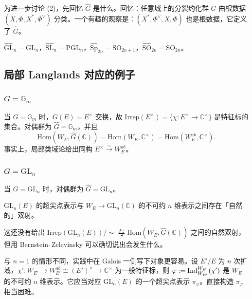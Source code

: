 为进一步讨论 (2)，先回忆 $\widehat{G}$ 是什么。回忆：任意域上的分裂约化群 $G$ 由根数据 $(X,\Phi,X^*,\Phi^\vee)$ 分类。一个有趣的观察是：$(X^*,\Phi^\vee,X,\Phi)$ 也是根数据，它定义了 $\widehat{G}$。

\begin{example}[一些对偶群]
$\widehat{\mathrm{GL}}_n=\mathrm{GL}_n$，$\widehat{\mathrm{SL}}_n=\mathrm{PGL}_n$，$\widehat{\mathrm{Sp}}_{2n}=\mathrm{SO}_{2n+1}$，$\widehat{\mathrm{SO}}_{2n}=\mathrm{SO}_{2n}$。
\end{example}

\subsection{局部 Langlands 对应的例子}

\subsubsection{$G=\mathbb{G}_m$}

当 $G=\mathbb{G}_m$ 时，$G(E)=E^\times$ 交换，故 $\mathrm{Irrep}(E^\times)=\{\chi:E^\times\to\mathbb{C}^\times\}$ 是特征标的集合。对偶群为 $\widehat{G}=\mathbb{G}_m$，并且
\[
\mathrm{Hom}(W_E,\widehat{G}(\mathbb{C}))=\mathrm{Hom}(W_E,\mathbb{C}^\times)=\mathrm{Hom}(W_E^{ab},\mathbb{C}^\times).
\]
事实上，局部类域论给出同构 $E^\times\xrightarrow{\sim}W_E^{ab}$。

\subsubsection{$G=\mathrm{GL}_n$}

当 $G=\mathrm{GL}_n$ 时，对偶群为 $\widehat{G}=\mathrm{GL}_n$。

\begin{theorem}
$\mathrm{GL}_n(E)$ 的超尖点表示与 $W_E\to\mathrm{GL}_n(\mathbb{C})$ 的不可约 $n$ 维表示之间存在「自然的」双射。
\end{theorem}

这还没有给出 $\mathrm{Irrep}(\mathrm{GL}_n(E))/\sim$ 与 $\mathrm{Hom}(W_E,\widehat{G}(\mathbb{C}))$ 之间的自然双射，但用 Bernstein--Zelevinsky 可以确切说出会发生什么。

\begin{example}[自守诱导]
与 $n=1$ 的情形不同，实践中在 Galois 一侧写下对象更容易。设 $E'/E$ 为 $n$ 次扩域，$\chi':W_{E'}\to W_{E'}^{ab}\cong(E')^\times\to\mathbb{C}^\times$ 为一般特征标，则 $\varphi:=\operatorname{Ind}_{W_{E'}}^{W_E}(\chi')$ 是 $W_E$ 的不可约 $n$ 维表示。它应当对应 $\mathrm{GL}_n(E)$ 的一个超尖点表示 $\pi_\varphi$。直接构造 $\pi_\varphi$ 相当困难。
\end{example}

